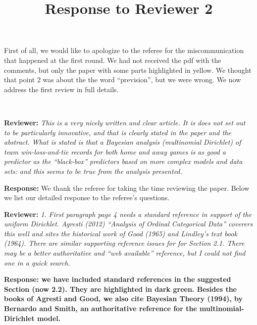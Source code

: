 \documentclass[11pt]{article}
\title{Response to Reviewer 2}
\date{}
\begin{document}


\maketitle

First of all, we would like to apologize to the referee for the miscommunication that happened at the first round. We had not received the pdf with the comments, but only the paper with some parts highlighted in yellow. We thought that point 2 was about the the word ``prevision'', but we were wrong. We now address the first review in full details.

\

\hspace{4mm} \textbf{Reviewer:} \textit{
	This is a very nicely written and clear article. It is does not set out to be particularly innovative, and that is clearly stated in the paper and the abstract. What is stated is that a Bayesian analysis (multinomial Dirichlet) of team win-loss-and-tie records for both home and away games is as good a predictor as the ``black-box'' predictors based on more complex models and data sets: and this seems to be true from the analysis presented.}

\vspace{2mm}
\textbf{Response:} We thank the referee for taking the time reviewing the paper. Below we list our detailed response to the referee's questions.\\

\vspace{6mm}

\hspace{4mm} \textbf{Reviewer:} 
	{\it 1. First paragraph page 4 needs a standard reference in support of the uniform Dirichlet. Agresti (2012) ``Analysis of Ordinal Categorical Data'' coverers this well and sites the historical work of Good (1965) and Lindley's text book (1964). There are similar supporting reference issues for for Section 2.1. There may be a better authoritative and ``web available'' reference, but I could not find one in a quick search.}

\vspace{2mm}
\textbf{Response: we have included standard references in the suggested Section (now 2.2). They are highlighted in dark green. Besides the books of Agresti and Good, we also cite Bayesian Theory (1994), by Bernardo and Smith, an authoritative reference for the multinomial-Dirichlet model.} 
\end{document}
